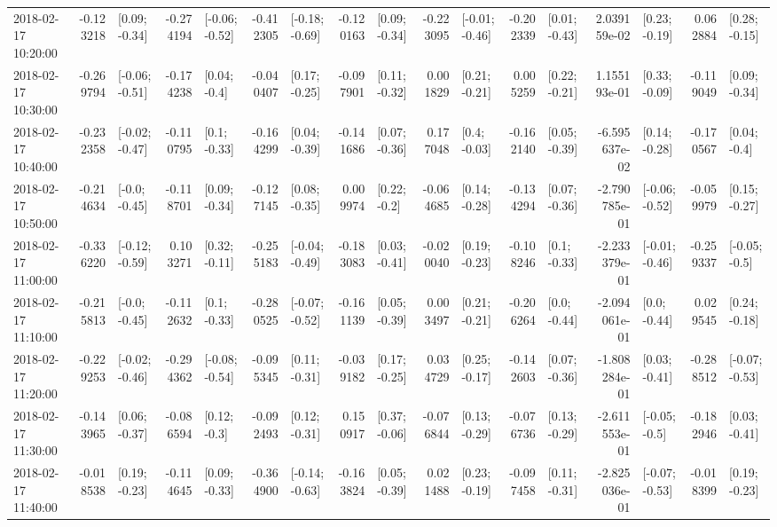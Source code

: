 \begin{tabular}{lrlrlrlrlrlrlrlrl}
2018-02-17 10:20:00 & -0.123218 &   [0.09; -0.34] & -0.274194 &  [-0.06; -0.52] & -0.412305 &  [-0.18; -0.69] & -0.120163 &   [0.09; -0.34] & -0.223095 &  [-0.01; -0.46] & -0.202339 &   [0.01; -0.43] &  2.039159e-02 &   [0.23; -0.19] &  0.062884 &   [0.28; -0.15] \\
2018-02-17 10:30:00 & -0.269794 &  [-0.06; -0.51] & -0.174238 &    [0.04; -0.4] & -0.040407 &   [0.17; -0.25] & -0.097901 &   [0.11; -0.32] &  0.001829 &   [0.21; -0.21] &  0.005259 &   [0.22; -0.21] &  1.155193e-01 &   [0.33; -0.09] & -0.119049 &   [0.09; -0.34] \\
2018-02-17 10:40:00 & -0.232358 &  [-0.02; -0.47] & -0.110795 &    [0.1; -0.33] & -0.164299 &   [0.04; -0.39] & -0.141686 &   [0.07; -0.36] &  0.177048 &    [0.4; -0.03] & -0.162140 &   [0.05; -0.39] & -6.595637e-02 &   [0.14; -0.28] & -0.170567 &    [0.04; -0.4] \\
2018-02-17 10:50:00 & -0.214634 &   [-0.0; -0.45] & -0.118701 &   [0.09; -0.34] & -0.127145 &   [0.08; -0.35] &  0.009974 &    [0.22; -0.2] & -0.064685 &   [0.14; -0.28] & -0.134294 &   [0.07; -0.36] & -2.790785e-01 &  [-0.06; -0.52] & -0.059979 &   [0.15; -0.27] \\
2018-02-17 11:00:00 & -0.336220 &  [-0.12; -0.59] &  0.103271 &   [0.32; -0.11] & -0.255183 &  [-0.04; -0.49] & -0.183083 &   [0.03; -0.41] & -0.020040 &   [0.19; -0.23] & -0.108246 &    [0.1; -0.33] & -2.233379e-01 &  [-0.01; -0.46] & -0.259337 &   [-0.05; -0.5] \\
2018-02-17 11:10:00 & -0.215813 &   [-0.0; -0.45] & -0.112632 &    [0.1; -0.33] & -0.280525 &  [-0.07; -0.52] & -0.161139 &   [0.05; -0.39] &  0.003497 &   [0.21; -0.21] & -0.206264 &    [0.0; -0.44] & -2.094061e-01 &    [0.0; -0.44] &  0.029545 &   [0.24; -0.18] \\
2018-02-17 11:20:00 & -0.229253 &  [-0.02; -0.46] & -0.294362 &  [-0.08; -0.54] & -0.095345 &   [0.11; -0.31] & -0.039182 &   [0.17; -0.25] &  0.034729 &   [0.25; -0.17] & -0.142603 &   [0.07; -0.36] & -1.808284e-01 &   [0.03; -0.41] & -0.288512 &  [-0.07; -0.53] \\
2018-02-17 11:30:00 & -0.143965 &   [0.06; -0.37] & -0.086594 &    [0.12; -0.3] & -0.092493 &   [0.12; -0.31] &  0.150917 &   [0.37; -0.06] & -0.076844 &   [0.13; -0.29] & -0.076736 &   [0.13; -0.29] & -2.611553e-01 &   [-0.05; -0.5] & -0.182946 &   [0.03; -0.41] \\
2018-02-17 11:40:00 & -0.018538 &   [0.19; -0.23] & -0.114645 &   [0.09; -0.33] & -0.364900 &  [-0.14; -0.63] & -0.163824 &   [0.05; -0.39] &  0.021488 &   [0.23; -0.19] & -0.097458 &   [0.11; -0.31] & -2.825036e-01 &  [-0.07; -0.53] & -0.018399 &   [0.19; -0.23] \\

\end{tabular}
